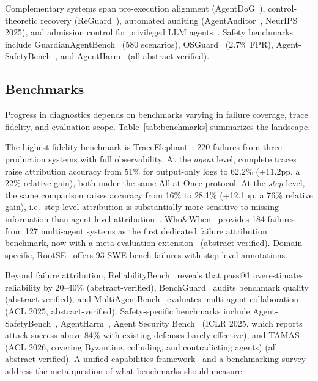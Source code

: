 Complementary systems span pre-execution alignment (AgentDoG~\cite{agentdog2026}), control-theoretic recovery (ReGuard~\cite{pandya2025}), automated auditing (AgentAuditor~\cite{agentauditor2025}, NeurIPS 2025), and admission control for privileged LLM agents~\cite{zhu2026leaseguard}. Safety benchmarks include GuardianAgentBench~\cite{guardianagentbench2026} (580 scenarios), OSGuard~\cite{osguard2026} (2.7\% FPR), Agent-SafetyBench~\cite{agentsafetybench2024}, and AgentHarm~\cite{agentharm2024} (all abstract-verified).

\subsection{Benchmarks}\label{sec:diag_bench}

Progress in diagnostics depends on benchmarks varying in failure coverage, trace fidelity, and evaluation scope. Table~\ref{tab:benchmarks} summarizes the landscape.

The highest-fidelity benchmark is TraceElephant~\cite{traceelephant2026}: 220 failures from three production systems with full observability. At the \emph{agent} level, complete traces raise attribution accuracy from 51\% for output-only logs to 62.2\% (+11.2pp, a 22\% relative gain), both under the same All-at-Once protocol. At the \emph{step} level, the same comparison raises accuracy from 16\% to 28.1\% (+12.1pp, a 76\% relative gain), i.e.\ step-level attribution is substantially more sensitive to missing information than agent-level attribution~\cite{traceelephant2026}. Who\&When~\cite{whenwhen2025} provides 184 failures from 127 multi-agent systems as the first dedicated failure attribution benchmark, now with a meta-evaluation extension~\cite{whwhpro2026} (abstract-verified). Domain-specific, RootSE~\cite{trajaudit2026} offers 93 SWE-bench failures with step-level annotations.

Beyond failure attribution, ReliabilityBench~\cite{reliabilitybench2026} reveals that pass@1 overestimates reliability by 20--40\% (abstract-verified), BenchGuard~\cite{benchguard2026} audits benchmark quality (abstract-verified), and MultiAgentBench~\cite{multiagentbench2025} evaluates multi-agent collaboration (ACL 2025, abstract-verified). Safety-specific benchmarks include Agent-SafetyBench~\cite{agentsafetybench2024}, AgentHarm~\cite{agentharm2024}, Agent Security Bench~\cite{asb2025} (ICLR 2025, which reports attack success above 84\% with existing defenses barely effective), and TAMAS~\cite{tamas2026} (ACL 2026, covering Byzantine, colluding, and contradicting agents) (all abstract-verified). A unified capabilities framework~\cite{unifiedcapab2026} and a benchmarking survey~\cite{evalbenchmark2025} address the meta-question of what benchmarks should measure.

